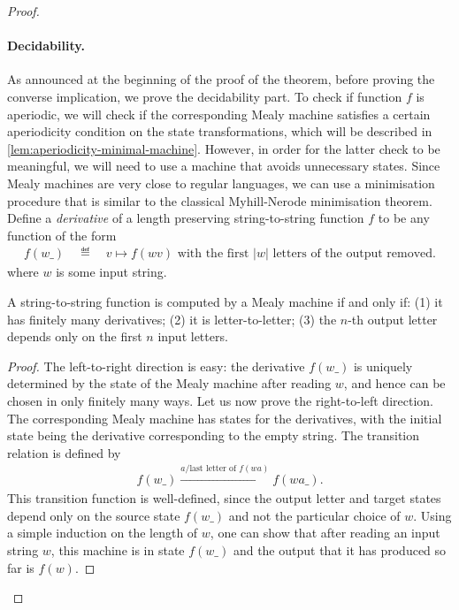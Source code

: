 \begin{proof}
    \paragraph*{Decidability.} As announced at the beginning of the proof of the theorem, before proving the converse implication, we  prove the decidability part. To check if function $f$ is aperiodic, we will check if the corresponding Mealy machine satisfies a certain aperiodicity condition on the state transformations, which will be described in \cref{lem:aperiodicity-minimal-machine}.  However, in order for the latter check to be meaningful, we will need to use a machine that avoids unnecessary states.  
    Since Mealy machines are very close to regular languages, we can use a minimisation procedure that is similar to the classical Myhill-Nerode minimisation theorem. 
    Define a \emph{derivative} of  a length preserving string-to-string function $f$ to be  any function of the form 
    \begin{align*}
    f(w\_)  \quad \eqdef \quad  v \mapsto f(wv) \text{ with the first $|w|$ letters of the output removed.}
    \end{align*}
    where $w$ is some input string. 
    
    \begin{lemma}\label{lem:derivatives}
        A string-to-string function is computed by a Mealy machine if and only if: (1) it has finitely many derivatives; (2)  it is letter-to-letter; (3) the $n$-th output letter depends only on the first $n$ input letters.
    \end{lemma}
    \begin{proof}
        The left-to-right direction is easy: the derivative $f(w\_)$ is uniquely determined by the state of the Mealy machine after reading $w$, and hence can be chosen in only finitely many ways. Let us now prove the right-to-left direction. The corresponding Mealy machine has states for the derivatives, with the initial state being the derivative corresponding to the empty string. The transition relation is defined by
        \begin{align*}
        f(w\_) \xrightarrow {a / \text{last letter of $f(wa)$}} f(wa\_).
        \end{align*}
        This transition function is well-defined, since the output letter and target states depend only on the source state $f(w\_)$ and not the particular choice of $w$. Using a simple induction on the length of $w$, one can show that after reading an input string $w$, this machine is in state $f(w\_)$ and the output that it has produced so far is $f(w)$.
    \end{proof}


\end{proof}
